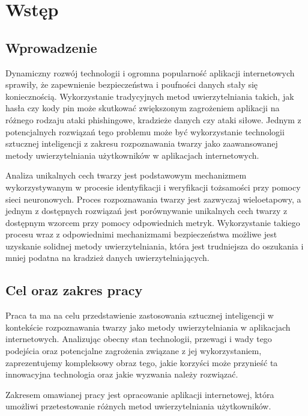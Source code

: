 \chapter{Wstęp}
\section{Wprowadzenie}
Dynamiczny rozwój technologii i ogromna popularność aplikacji internetowych sprawiły, że zapewnienie bezpieczeństwa i poufności danych stały się koniecznością. Wykorzystanie tradycyjnych metod uwierzytelniania takich, jak hasła czy kody pin może skutkować zwiększonym zagrożeniem aplikacji na różnego rodzaju ataki phishingowe, kradzieże danych czy ataki siłowe. Jednym z potencjalnych rozwiązań tego problemu może być wykorzystanie technologii sztucznej inteligencji z zakresu rozpoznawania twarzy jako zaawansowanej metody uwierzytelniania użytkowników w aplikacjach internetowych.

Analiza unikalnych cech twarzy jest podstawowym mechanizmem wykorzystywanym w procesie identyfikacji i weryfikacji tożsamości przy pomocy sieci neuronowych. Proces rozpoznawania twarzy jest zazwyczaj wieloetapowy, a jednym z dostępnych rozwiązań jest porównywanie unikalnych cech twarzy z dostępnym wzorcem przy pomocy odpowiednich metryk. Wykorzystanie takiego procesu wraz z odpowiednimi mechanizmami bezpieczeństwa możliwe jest uzyskanie solidnej metody uwierzytelniania, która jest trudniejsza do oszukania i mniej podatna na kradzież danych uwierzytelniających.
\section{Cel oraz zakres pracy}
Praca ta ma na celu przedstawienie zastosowania sztucznej inteligencji w kontekście rozpoznawania twarzy jako metody uwierzytelniania w aplikacjach internetowych. Analizując obecny stan technologii, przewagi i wady tego podejścia oraz potencjalne zagrożenia związane z jej wykorzystaniem, zaprezentujemy kompleksowy obraz tego, jakie korzyści może przynieść ta innowacyjna technologia oraz jakie wyzwania należy rozwiązać.

Zakresem omawianej pracy jest opracowanie aplikacji internetowej, która umożliwi przetestowanie różnych metod uwierzytelniania użytkowników.



